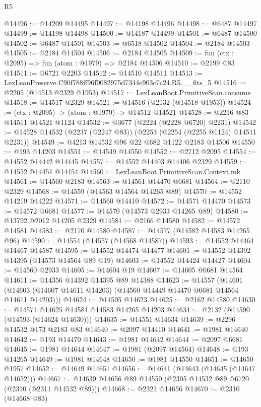 \begin{lexlean}{R5}
\begin{coremodule}
@14496 := @14209 @14495
@14497 := @14198 @14496
@14498 := @6487 @14497
@14499 := @14198 @14498
@14500 := @14187 @14499
@14501 := @6487 @14500
@14502 := @6487 @14501
@14503 := @6518 @14502
@14504 := @2184 @14503
@14505 := @2184 @14504
@14506 := @2184 @14505
@14509 := fun (ctx : @2095) => fun (atom : @1979) => @2184 @14506
@14510 := @2199 @83
@14511 := @6721 @2203
@14512 := @14510 @14511
@14513 := LexLeanPreserve.C90f788ff96f0082975d7344e903c7c24.R5.__fits_5
@14516 := @2205 (@14513 @2329 @1953)
@14517 := LexLeanBoot.PrimitiveScan.consume
@14518 := @14517 @2329
@14521 := @14516 (@2132 (@14518 @1953))
@14524 := (ctx : @2095) -> (atom : @1979) -> @14512 @14521
@14528 := @2216 @83 @14511 @14521 @1124
@14532 := @3677 (@2224 (@2228 @6720) @2231)
@14542 := @14528 @14532 (@2237 (@2247 @83)) (@2253 (@2254 (@2255 @1124) @14511 @2231))
@14549 := @4213 @14532 @96 @22 @682 @1122 @2183 @14506
@14550 := @193 @14203
@14551 := @14549 @14550
@14552 := @2712 @2095
@14554 := @14552 @14442 @14445
@14557 := @14552 @14403 @14406 @2329
@14559 := @14552 @14451 @14454
@14560 := LexLeanBoot.PrimitiveScan.Context.mk
@14561 := @14560 @2183
@14563 := @14561 @14470 @6681
@14564 := @2110 @2329
@14568 := @14559 (@14563 @14564 @14265 @89)
@14570 := @14552 @14219 @14222
@14571 := @14560 @14410
@14572 := @14571 @14470
@14573 := @14572 @6681
@14577 := @14570 (@14573 @2933 @14265 @89)
@14580 := @13792 @2012 @14205 @2329
@14581 := @2166 @14580
@14582 := @14572 @14581
@14583 := @2170 @14580
@14587 := @14577 (@14582 @14583 @14265 @96)
@14590 := @14554 (@14557 (@14568 @14587))
@14593 := @14552 @14464 @14467 @14587
@14595 := @14552 @14474 @14477
@14601 := @14552 @14392 @14395 (@14573 @14564 @89 @19)
@14603 := @14552 @14424 @14427
@14604 := @14560 @2933
@14605 := @14604 @19
@14607 := @14605 @6681 @14564
@14611 := @14356 @14392 @14395 @89 @14388
@14623 := @14557
    (@14601 (@14603 (@14607 @14611 @14203) (@14560 @14449 @14470 @6681 @14564 @14611 @14203)))
@14624 := @14595 @14623
@14625 := @2162 @14580
@14630 := @14571 @14625 @14581 @14583 @14265 @14203
@14634 := @2132 (@14590 (@14593 (@14624 @14630)))
@14635 := @14551 @14634
@14639 := @2296 @14532 @173 @2183 @83
@14640 := @2097 @14410
@14641 := @1981 @14640
@14642 := @193 @14470
@14643 := @1981 @14642
@14644 := @2097 @6681
@14645 := @1981 @14644
@14647 := @1981 (@2097 @14564)
@14648 := @193 @14265
@14649 := @1981 @14648
@14650 := @1981 @14550
@14651 := @14650 @1957
@14652 := @14649 @14651
@14656 := @14641 (@14643 (@14645 (@14647 @14652)))
@14667 := @14639 @14656 @89 @14550 (@2305 @14532 @89 @6720 (@2310 (@2311 @14532 @89)))
@14668 := @2321 @14656
@14670 := @2310 (@14668 @83)

\end{coremodule}
\end{lexlean}
